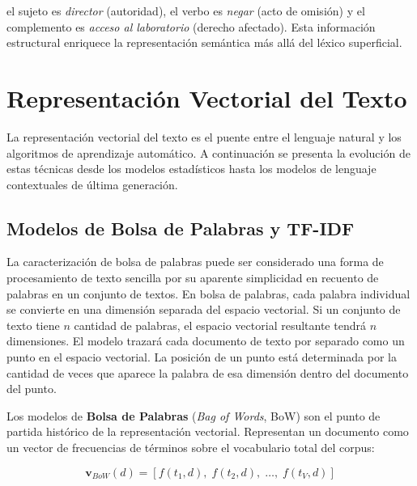 \noindent el sujeto es \textit{director} (autoridad), el verbo es \textit{negar}
(acto de omisión) y el complemento es \textit{acceso al laboratorio} (derecho
afectado). Esta información estructural enriquece la representación semántica
más allá del léxico superficial.

\section{Representación Vectorial del Texto}

La representación vectorial del texto es el puente entre el lenguaje natural
y los algoritmos de aprendizaje automático. A continuación se presenta la
evolución de estas técnicas desde los modelos estadísticos hasta los modelos
de lenguaje contextuales de última generación.

\subsection{Modelos de Bolsa de Palabras y TF-IDF}

La caracterización de bolsa de palabras puede ser considerado una forma de
procesamiento de texto sencilla por su aparente simplicidad en recuento de
palabras en un conjunto de textos. En bolsa de palabras, cada palabra individual
se convierte en una dimensión separada del espacio vectorial. Si un conjunto de
texto tiene $n$ cantidad de palabras, el espacio vectorial resultante tendrá $n$
dimensiones. El modelo trazará cada documento de texto por separado como un punto
en el espacio vectorial. La posición de un punto está determinada por la cantidad
de veces que aparece la palabra de esa dimensión dentro del documento del punto.

Los modelos de \textbf{Bolsa de Palabras} (\textit{Bag of Words}, BoW) son el
punto de partida histórico de la representación vectorial. Representan un
documento como un vector de frecuencias de términos sobre el vocabulario total
del corpus:

\begin{equation}
  \mathbf{v}_{BoW}(d) = [f(t_1, d),\; f(t_2, d),\; \ldots,\; f(t_V, d)]
  \label{eq:bow}
\end{equation}

